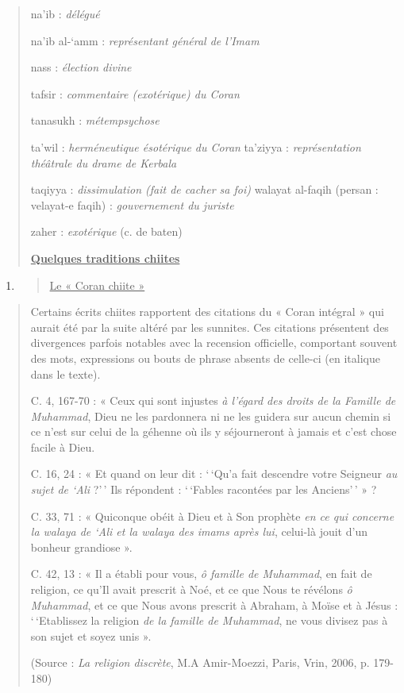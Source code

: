 \begin{quote}
na'ib : \emph{délégué}

na'ib al-`amm : \emph{représentant général de l'Imam}

nass : \emph{élection divine}

tafsir : \emph{commentaire (exotérique) du Coran}

tanasukh : \emph{métempsychose}

ta'wil : \emph{herméneutique ésotérique du Coran} ta'ziyya :
\emph{représentation théâtrale du drame de Kerbala}

taqiyya : \emph{dissimulation (fait de cacher sa foi)} walayat al-faqih
(persan : velayat-e faqih) : \emph{gouvernement du juriste}

zaher : \emph{exotérique} (c. de baten)

\textbf{\underline{Quelques traditions chiites}}
\end{quote}

\begin{enumerate}
\def\labelenumi{\arabic{enumi}.}
\item
  \begin{quote}
  \underline{Le « Coran chiite »}
  \end{quote}
\end{enumerate}

\begin{quote}
Certains écrits chiites rapportent des citations du « Coran intégral »
qui aurait été par la suite altéré par les sunnites. Ces citations
présentent des divergences parfois notables avec la recension
officielle, comportant souvent des mots, expressions ou bouts de phrase
absents de celle-ci (en italique dans le texte).

C. 4, 167-70 : « Ceux qui sont injustes \emph{à l'égard des droits de la
Famille de Muhammad}, Dieu ne les pardonnera ni ne les guidera sur aucun
chemin si ce n'est sur celui de la géhenne où ils y séjourneront à
jamais et c'est chose facile à Dieu.

C. 16, 24 : « Et quand on leur dit : `\,`Qu'a fait descendre votre
Seigneur \emph{au sujet de `Ali} ?'\,' Ils répondent : `\,`Fables
racontées par les Anciens'\,' » ?

C. 33, 71 : « Quiconque obéit à Dieu et à Son prophète \emph{en ce qui
concerne la walaya de `Ali et la walaya des imams après lui}, celui-là
jouit d'un bonheur grandiose ».

C. 42, 13 : « Il a établi pour vous, \emph{ô famille de Muhammad}, en
fait de religion, ce qu'Il avait prescrit à Noé, et ce que Nous te
révélons \emph{ô Muhammad}, et ce que Nous avons prescrit à Abraham, à
Moïse et à Jésus : `\,`Etablissez la religion \emph{de la famille de
Muhammad}, ne vous divisez pas à son sujet et soyez unis ».

(Source : \emph{La religion discrète}, M.A Amir-Moezzi, Paris, Vrin,
2006, p. 179-180)
\end{quote}

